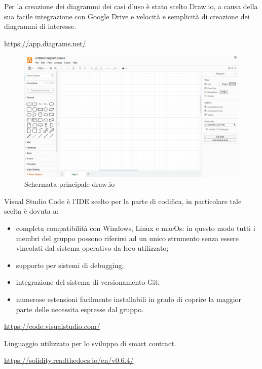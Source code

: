 	Per la creazione dei diagrammi dei casi d'uso è stato scelto Draw.io, a causa della sua facile integrazione con Google Drive e velocità e semplicità di creazione dei diagrammi di interesse.  
	\begin{center}
		\url{https://app.diagrams.net/}
	\end{center}
	\begin{figure}[h!]
		\centering
		\includegraphics[scale=0.62]{./res/img/draw.png}
		\caption{Schermata principale draw.io}
	\end{figure}
	
	Visual Studio Code è l'IDE scelto per la parte di codifica, in particolare tale scelta è dovuta a: 
	\begin{itemize}
		\item completa compatibilità con Windows, Linux e macOs: in questo modo tutti i membri del gruppo possono riferirsi ad un unico strumento senza essere vincolati dal sistema operativo da loro utilizzato; 
		\item supporto per sistemi di debugging; 
		\item integrazione del sistema di versionamento Git; 
		\item numerose estensioni facilmente installabili in grado di coprire la maggior parte delle necessita espresse dal gruppo. 
	\end{itemize} 
	\begin{center}
		\url{https://code.visualstudio.com/}
	\end{center}

	Linguaggio utilizzato per lo sviluppo di smart contract.
	\begin{center}
		\url{https://solidity.readthedocs.io/en/v0.6.4/}
	\end{center}

